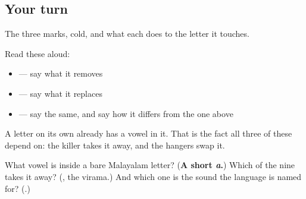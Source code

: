 \subsection*{Your turn}
The three marks, cold, and what each does to the letter it touches.

Read these aloud:

\begin{itemize}
\raggedright
  \item \textbf{} — say what it removes
  \item \textbf{} — say what it replaces
  \item \textbf{} — say the same, and say how it differs from the one above
\end{itemize}

A letter on its own already has a vowel in it. That is the fact all three of these depend on: the killer takes it away, and the hangers swap it.

\begin{tcolorbox}[breakable,colback=teal!4,colframe=teal!35!black,title={Before you move on}]
What vowel is inside a bare Malayalam letter? (\textbf{A short \emph{a}.}) Which of the nine takes it away? (\textbf{}, the virama.) And which one is the sound the language is named for? (\textbf{}.)
\end{tcolorbox}
